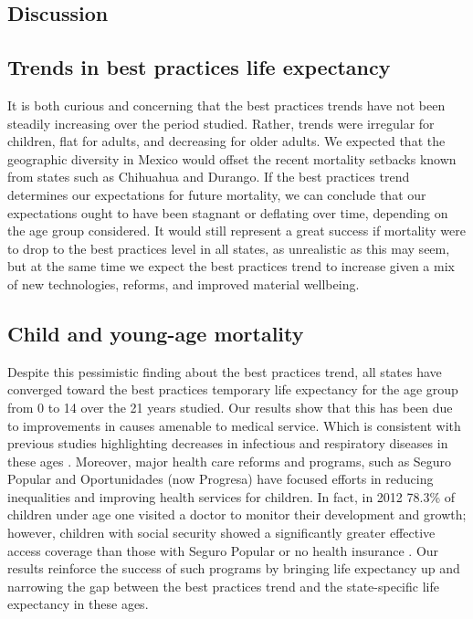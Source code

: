 \documentclass{article}
\begin{document}
\begin{spacing}{1.5}


\section*{Discussion}
\subsection*{Trends in best practices life expectancy}
It is both curious and concerning that the best practices trends have not been
steadily increasing over the period studied. Rather, trends were irregular for
children, flat for adults, and decreasing for older adults. We expected
that the geographic diversity in Mexico would offset the recent mortality
setbacks known from states such as Chihuahua and Durango. If the best practices
trend determines our expectations for future mortality, we can conclude that
our expectations ought to have been stagnant or deflating over time, depending
on the age group considered. It would still represent a great success if
mortality were to drop to the best practices level in all states, as unrealistic as this may seem, but at the same time we expect
the best practices trend to increase given a mix of new technologies, reforms,
and improved material wellbeing.

\subsection*{Child and young-age mortality}
Despite this pessimistic finding about the best practices trend, all states have
converged toward the best practices temporary life expectancy for the age group
from 0 to 14 over the 21 years studied. Our results show that this has been due to improvements in causes amenable to medical service. Which is consistent with previous studies highlighting decreases in infectious and respiratory diseases in these ages \citep{canudas2014}. Moreover, major health care reforms and programs, such as Seguro Popular and Oportunidades (now Progresa) have focused efforts in reducing inequalities and improving health services for children. In fact, in 2012 78.3\% of children under age one visited a doctor to monitor their development and growth; however, children with social security showed a significantly greater effective access coverage  than those with Seguro Popular or no health insurance \citep{urquieta2015evolution}. Our results reinforce the success of such programs by bringing life expectancy up and narrowing the gap between the best practices trend and the state-specific life expectancy in these ages.


\end{spacing}
\end{document}
